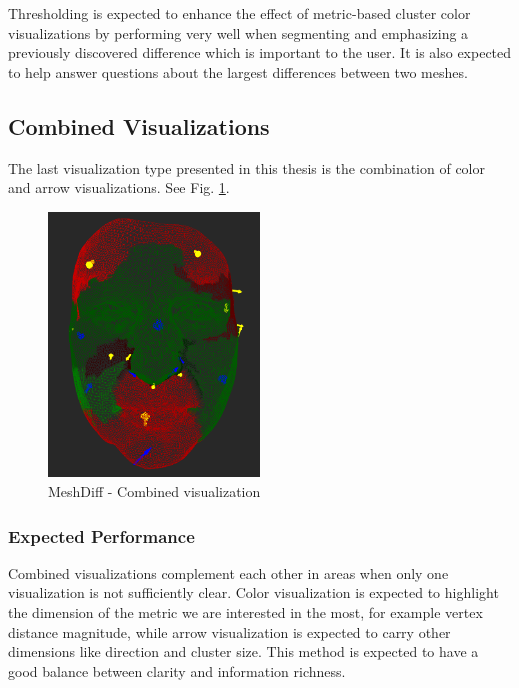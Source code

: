 Thresholding is expected to enhance the effect of metric-based cluster color visualizations by performing very well when segmenting and emphasizing a previously discovered difference which is important to the user. It is also expected to help answer questions about the largest differences between two meshes.
\subsection{Combined Visualizations}
\label{subsec:analysis-visualizations-combined}

The last visualization type presented in this thesis is the combination of color and arrow visualizations. See Fig. \ref{fig:meshdiff-combination}.

\begin{figure}[h]
\centering
\includegraphics[width=0.5\textwidth]{./img/meshdiff-combination.PNG}
\caption[MeshDiff - Combined visualization]{MeshDiff - Combined visualization}
\label{fig:meshdiff-combination}
\end{figure}

\subsubsection{Expected Performance}

Combined visualizations complement each other in areas when only one visualization is not sufficiently clear. Color visualization is expected to highlight the dimension of the metric we are interested in the most, for example vertex distance magnitude, while arrow visualization is expected to carry other dimensions like direction and cluster size. This method is expected to have a good balance between clarity and information richness.
